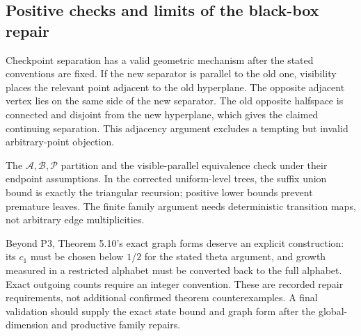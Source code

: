 \documentclass[10pt]{article}
\begin{document}
\subsection*{Positive checks and limits of the black-box repair}
Checkpoint separation has a valid geometric mechanism after the stated conventions are fixed. If the new separator is parallel to the old one, visibility places the relevant point adjacent to the old hyperplane. The opposite adjacent vertex lies on the same side of the new separator. The old opposite halfspace is connected and disjoint from the new hyperplane, which gives the claimed continuing separation. This adjacency argument excludes a tempting but invalid arbitrary-point objection.\par
The \(\mathcal A,\mathcal B,\mathcal P\) partition and the visible-parallel equivalence check under their endpoint assumptions. In the corrected uniform-level trees, the suffix union bound is exactly the triangular recursion; positive lower bounds prevent premature leaves. The finite family argument needs deterministic transition maps, not arbitrary edge multiplicities.\par
Beyond P3, Theorem 5.10’s exact graph forms deserve an explicit construction: its \(c_1\) must be chosen below \(1/2\) for the stated theta argument, and growth measured in a restricted alphabet must be converted back to the full alphabet. Exact outgoing counts require an integer convention. These are recorded repair requirements, not additional confirmed theorem counterexamples. A final validation should supply the exact state bound and graph form after the global-dimension and productive family repairs.\par
\end{document}
